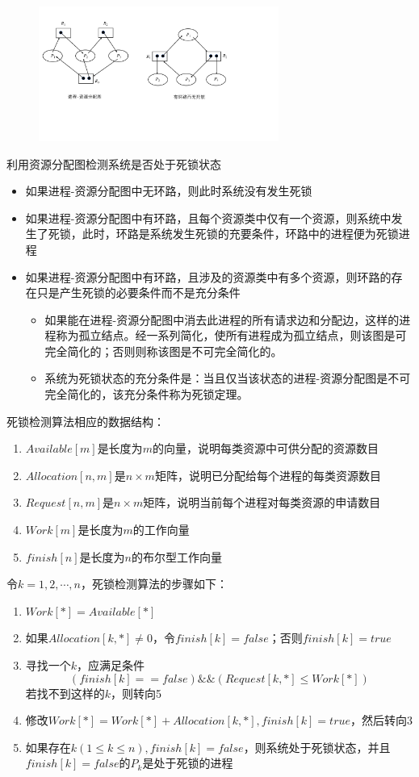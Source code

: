\documentclass[cs4size,a4paper,10pt]{ctexart}
\begin{document}
	\begin{figure}[H]
		\centering
		\includegraphics[width=0.7\textwidth]{img/进程-资源分配图.pdf}
	\end{figure}

	利用资源分配图检测系统是否处于死锁状态
	\begin{itemize}
		\item 如果进程-资源分配图中无环路，则此时系统没有发生死锁
		\item 如果进程-资源分配图中有环路，且每个资源类中仅有一个资源，则系统中发生了死锁，此时，环路是系统发生死锁的充要条件，环路中的进程便为死锁进程
		\item 如果进程-资源分配图中有环路，且涉及的资源类中有多个资源，则环路的存在只是产生死锁的必要条件而不是充分条件
		\begin{itemize}
			\item 如果能在进程-资源分配图中消去此进程的所有请求边和分配边，这样的进程称为孤立结点。经一系列简化，使所有进程成为孤立结点，则该图是可完全简化的；否则则称该图是不可完全简化的。
			\item 系统为死锁状态的充分条件是：当且仅当该状态的进程-资源分配图是不可完全简化的，该充分条件称为死锁定理。
		\end{itemize}
	\end{itemize}

	死锁检测算法相应的数据结构：
	\begin{enumerate}[label=\arabic*.]
		\item $Available[m]$是长度为$m$的向量，说明每类资源中可供分配的资源数目
		\item $Allocation[n,m]$是$n\times m$矩阵，说明已分配给每个进程的每类资源数目
		\item $Request[n,m]$是$n\times m$矩阵，说明当前每个进程对每类资源的申请数目
		\item $Work[m]$是长度为$m$的工作向量
		\item $finish[n]$是长度为$n$的布尔型工作向量
	\end{enumerate}
	令$k=1,2,\cdots,n$，死锁检测算法的步骤如下：
	\begin{enumerate}[label=\arabic*.]
		\item $Work[*] = Available[*]$
		\item 如果$Allocation[k,*] \neq 0$，令$finish[k]=false$；否则$finish[k]=true$
		\item 寻找一个$k$，应满足条件
		$$(finish[k]==false)\&\&(Request[k,*]\leq Work[*])$$
		若找不到这样的$k$，则转向5
		\item 修改$Work[*] = Work[*]+Allocation[k,*],finish[k]=true$，然后转向3
		\item 如果存在$k(1\leq k\leq n),finish[k]=false$，则系统处于死锁状态，并且$finish[k]=false$的$P_k$是处于死锁的进程
	\end{enumerate}
	
\end{document}
